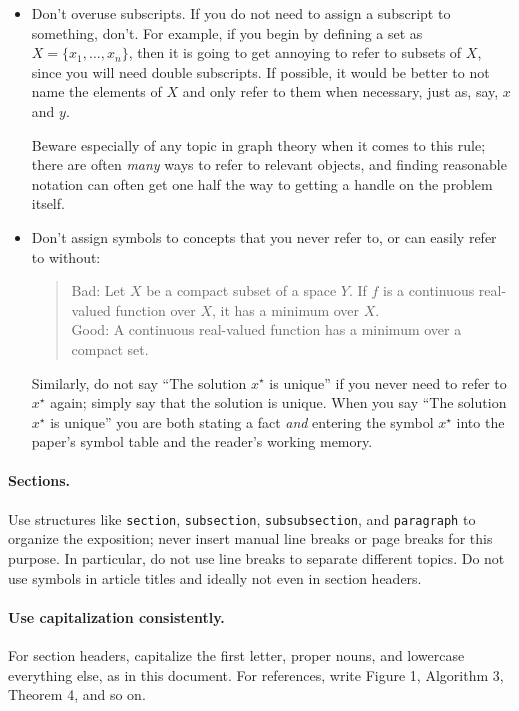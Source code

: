 \documentclass{article}
\begin{document}
\begin{itemize}
\item Don't overuse subscripts. If you do not need to assign a subscript to something, don't. 
    For example, if you begin by defining a set as $X = \{x_1, \dots, x_n\}$, then it is going to get annoying to refer to subsets of $X$, since you will need double subscripts. 
    If possible, it would be better to not name the elements of $X$ and only refer to them when necessary, just as, say, $x$ and $y$. 

    Beware especially of any topic in graph theory when it comes to this rule; there are often \emph{many} ways to refer to relevant objects, and finding reasonable notation can often get one half the way to getting a handle on the problem itself.

\item Don't assign symbols to concepts that you never refer to, or can easily refer to without:
    \begin{quote}
        Bad: Let $X$ be a compact subset of a space $Y$. 
        If $f$ is a continuous real-valued function over $X$, it has a minimum over $X$. \\
        Good: A continuous real-valued function has a minimum over a compact set.
    \end{quote}
    Similarly, do not say ``The solution $x^\star$ is unique'' if you never need to refer to $x^\star$ again; simply say that the solution is unique.
    When you say ``The solution $x^\star$ is unique'' you are both stating a fact \emph{and} entering the symbol $x^\star$ into the paper's symbol table and the reader's working memory.
\end{itemize}

\paragraph{Sections.}
Use structures like \texttt{section}, \texttt{subsection}, \texttt{subsubsection}, and \texttt{paragraph} to organize the exposition; never insert manual line breaks or page breaks for this purpose. 
In particular, do not use line breaks to separate different topics. 
Do not use symbols in article titles and ideally not even in section headers.

\paragraph{Use capitalization consistently.}
For section headers, capitalize the first letter, proper nouns, and lowercase everything else, as in this document. 
For references, write Figure 1, Algorithm 3, Theorem 4, and so on.
\end{document}
